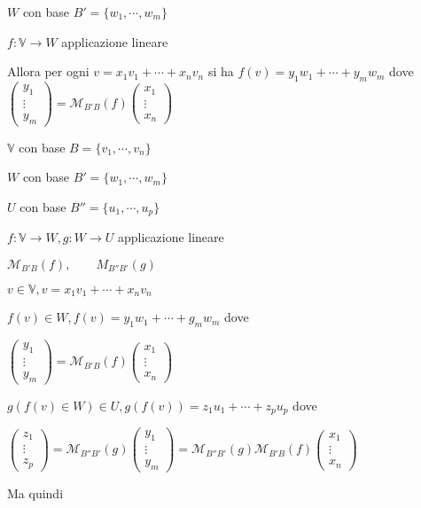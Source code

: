 \documentclass{article}
\newcommand{\V}{\mathbb{V}}
\newcommand{\M}{\mathcal{M}}
\begin{document}
$W$ con base $B'=\{w_1,\cdots,w_m\}$

$f:\V\rightarrow W$ applicazione lineare

Allora per ogni $v=x_1v_1+\cdots+x_nv_n$ si ha $f(v)=y_1w_1+\cdots+y_mw_m$ dove $\begin{pmatrix}y_1\\\vdots\\y_m\end{pmatrix}=\M_{B'B}(f)\begin{pmatrix}x_1\\\vdots\\x_n\end{pmatrix}$



$\V$ con base $B=\{v_1,\cdots,v_n\}$

$W$ con base $B'=\{w_1,\cdots,w_m\}$

$U$ con base $B''=\{u_1,\cdots,u_p\}$

$f:\V\rightarrow W, g:W\rightarrow U$ applicazione lineare

$\M_{B'B}(f),\qquad M_{B''B'}(g)$

$v\in\V,v=x_1v_1+\cdots+x_nv_n$

$f(v)\in W, f(v)=y_1w_1+\cdots+g_mw_m$ dove

$\begin{pmatrix}y_1\\\vdots\\y_m\end{pmatrix}=\M_{B'B}(f)\begin{pmatrix}x_1\\\vdots\\x_n\end{pmatrix}$

$g(f(v)\in W)\in U, g(f(v))=z_1u_1+\cdots+z_pu_p$ dove

$\begin{pmatrix}z_1\\\vdots\\z_p\end{pmatrix}=\M_{B''B'}(g)\begin{pmatrix}y_1\\\vdots\\y_m\end{pmatrix}=\M_{B''B'}(g)\M_{B'B}(f)\begin{pmatrix}x_1\\\vdots\\x_n\end{pmatrix}$

Ma quindi
\end{document}
